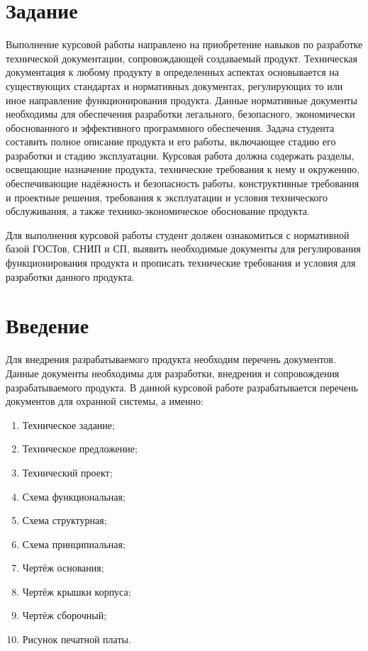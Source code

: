 \chapter*{Задание}
Выполнение курсовой работы направлено на приобретение навыков по разработке технической документации, сопровождающей создаваемый продукт. 
Техническая документация к любому продукту в определенных аспектах основывается на существующих стандартах и нормативных документах, регулирующих то или иное направление функционирования продукта. 
Данные нормативные документы необходимы для обеспечения разработки легального, безопасного, экономически обоснованного и эффективного программного обеспечения. Задача студента составить полное описание продукта и его работы, включающее стадию его разработки и стадию эксплуатации. Курсовая работа должна содержать разделы, освещающие назначение продукта, технические требования к нему и окружению, обеспечивающие надёжность и безопасность работы, конструктивные требования и проектные решения, требования к эксплуатации и условия технического обслуживания, а также технико-экономическое обоснование продукта. 

Для выполнения курсовой работы студент должен ознакомиться с нормативной базой ГОСТов, СНИП и СП, выявить необходимые документы для регулирования функционирования продукта и прописать технические требования и условия для разработки данного продукта.

\chapter*{Введение}
Для внедрения разрабатываемого продукта необходим перечень документов.
Данные документы необходимы для разработки, внедрения и сопровождения разрабатываемого продукта.
В данной курсовой работе разрабатывается перечень документов для охранной системы, а именно:
\begin{enumerate}
	\item Техническое задание;
	\item Техническое предложение;
	\item Технический проект;
	\item Схема функциональная;
	\item Схема структурная;
	\item Схема принципиальная;
	\item Чертёж основания;
	\item Чертёж крышки корпуса;
	\item Чертёж сборочный;
	\item Рисунок печатной платы.
\end{enumerate}

